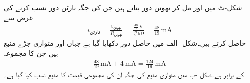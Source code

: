شکل-ٹ میں  اور   مل کر تھونن دور بناتے ہیں جن کی جگہ نارٹن دور نسب کرنے کی غرض سے 
\begin{align*}
i_{\text{نارٹن}}=\frac{v_{\text{تھونن}}}{R_{\text{تھونن}}}=\frac{\frac{48}{7} \, \si{\volt}}{\frac{19}{7} \, \si{\kilo\ohm}}=\frac{48}{19}\,\si{\milli\ampere}
\end{align*}
حاصل کرتے ہیں۔شکل -الف میں حاصل دور دکھایا گیا ہے جہاں  اور  متوازی جڑے منبع ہیں جن کا مجموعہ 
\begin{align*}
\frac{48}{19}\,\si{\milli\ampere}+\SI{4}{\milli\ampere}=\frac{124}{19}\,\si{\milli\ampere}
\end{align*}
کے برابر ہے۔شکل -ب میں متوازی منبع کی جگہ ان کی مجموعی قیمت کا منبع نسب کیا گیا ہے۔
